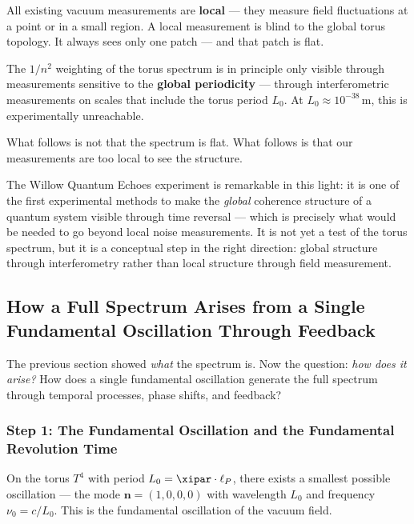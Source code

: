 \begin{conclusionBox}
All existing vacuum measurements are \textbf{local} — they measure field
fluctuations at a point or in a small region. A local measurement is blind to
the global torus topology. It always sees only one patch — and that patch is flat.

The $1/n^2$ weighting of the torus spectrum is in principle only visible through
measurements sensitive to the \textbf{global periodicity} — through interferometric
measurements on scales that include the torus period $L_0$. At
$L_0 \approx 10^{-38}$\,m, this is experimentally unreachable.

What follows is not that the spectrum is flat. What follows is that our
measurements are too local to see the structure.
\end{conclusionBox}

The Willow Quantum Echoes experiment is remarkable in this light: it is one of
the first experimental methods to make the \emph{global} coherence structure of a
quantum system visible through time reversal — which is precisely what would be
needed to go beyond local noise measurements. It is not yet a test of the torus
spectrum, but it is a conceptual step in the right direction: global structure
through interferometry rather than local structure through field measurement.

\subsection{How a Full Spectrum Arises from a Single Fundamental Oscillation
Through Feedback}

The previous section showed \emph{what} the spectrum is. Now the question:
\emph{how does it arise?} How does a single fundamental oscillation generate the
full spectrum through temporal processes, phase shifts, and feedback?

\subsubsection*{Step 1: The Fundamental Oscillation and the Fundamental Revolution Time}

On the torus $T^4$ with period $L_0 = \xipar \cdot \ell_P$, there exists a
smallest possible oscillation — the mode $\mathbf{n} = (1,0,0,0)$ with
wavelength $L_0$ and frequency $\nu_0 = c/L_0$. This is the fundamental
oscillation of the vacuum field.

